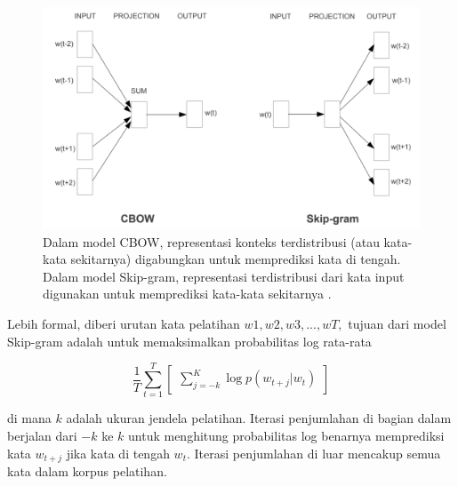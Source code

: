     \begin{figure}[ht]
        \centering
        \includegraphics[width=1\textwidth]{resources/cbow-skip-gram-illustration.png}
        \caption[Ilustrasi model CBOW dan Skip-gram.]{ Dalam model CBOW, representasi konteks terdistribusi (atau kata-kata sekitarnya) digabungkan untuk memprediksi kata di tengah. Dalam model Skip-gram, representasi terdistribusi dari kata input digunakan untuk memprediksi kata-kata sekitarnya \parencite{MikolovExploiting}.}
        \label{fig:ilustrasi_cbow_skip_gram}
    \end{figure}
    
    Lebih formal, diberi urutan kata pelatihan \(w1, w2, w3,. . . , wT,\) tujuan dari model Skip-gram adalah untuk memaksimalkan probabilitas log rata-rata

    \begin{equation}
        \frac{1}{T}\sum_{t=1}^{T}\begin{bmatrix}
        \sum_{j=-k}^{K}{\log p(w_{t+j}|w_{t})}
        \end{bmatrix}
        \label{eq:1}
    \end{equation}

    di mana \(k\) adalah ukuran jendela pelatihan. Iterasi penjumlahan di bagian dalam berjalan dari \({-k}\) ke \(k\) untuk menghitung probabilitas log benarnya memprediksi kata \(w_{t+j}\) jika kata di tengah \(w_{t}\). Iterasi penjumlahan di luar mencakup semua kata dalam korpus pelatihan. 


